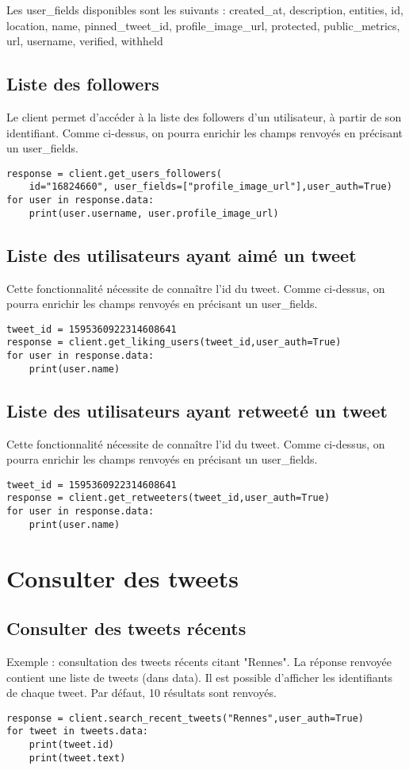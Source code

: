 \documentclass[11pt,a4paper]{article}
\begin{document}
Les user\_fields disponibles sont les suivants : 
created\_at, description, entities, id, location, name, pinned\_tweet\_id, profile\_image\_url, protected, public\_metrics, url, username, verified, withheld

\subsection{Liste des followers}

Le client permet d'accéder à la liste des followers d'un utilisateur, à partir de son identifiant. Comme ci-dessus, on pourra enrichir les champs renvoyés en précisant un user\_fields.

\begin{lstlisting}
response = client.get_users_followers(
    id="16824660", user_fields=["profile_image_url"],user_auth=True)
for user in response.data:
    print(user.username, user.profile_image_url)
\end{lstlisting}

\subsection{Liste des utilisateurs ayant aimé un tweet}
Cette fonctionnalité nécessite de connaître l'id du tweet. Comme ci-dessus, on pourra enrichir les champs renvoyés en précisant un user\_fields.
\begin{lstlisting}
tweet_id = 1595360922314608641
response = client.get_liking_users(tweet_id,user_auth=True)
for user in response.data:
    print(user.name)
\end{lstlisting}


\subsection{Liste des utilisateurs ayant retweeté un tweet}
Cette fonctionnalité nécessite de connaître l'id du tweet. Comme ci-dessus, on pourra enrichir les champs renvoyés en précisant un user\_fields.
\begin{lstlisting}
tweet_id = 1595360922314608641
response = client.get_retweeters(tweet_id,user_auth=True)
for user in response.data:
    print(user.name)
\end{lstlisting}

\section{Consulter des tweets}

\subsection{Consulter des tweets récents}
Exemple : consultation des tweets récents citant "Rennes". La réponse renvoyée contient une liste de tweets (dans data). Il est possible d'afficher les identifiants de chaque tweet. Par défaut, 10 résultats sont renvoyés. 
\begin{lstlisting}
response = client.search_recent_tweets("Rennes",user_auth=True)
for tweet in tweets.data:
    print(tweet.id)
    print(tweet.text)
\end{lstlisting}  
\end{document}
